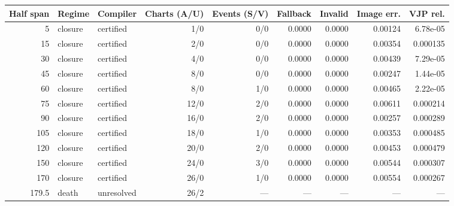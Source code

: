 \begin{tabular}{rllrrrrrr}
\toprule
Half span & Regime & Compiler & Charts (A/U) & Events (S/V) & Fallback & Invalid & Image err. & VJP rel. \\
\midrule
5 & closure & certified & 1/0 & 0/0 & 0.0000 & 0.0000 & 0.00124 & 6.78e-05 \\
15 & closure & certified & 2/0 & 0/0 & 0.0000 & 0.0000 & 0.00354 & 0.000135 \\
30 & closure & certified & 4/0 & 0/0 & 0.0000 & 0.0000 & 0.00439 & 7.29e-05 \\
45 & closure & certified & 8/0 & 0/0 & 0.0000 & 0.0000 & 0.00247 & 1.44e-05 \\
60 & closure & certified & 8/0 & 1/0 & 0.0000 & 0.0000 & 0.00465 & 2.22e-05 \\
75 & closure & certified & 12/0 & 2/0 & 0.0000 & 0.0000 & 0.00611 & 0.000214 \\
90 & closure & certified & 16/0 & 2/0 & 0.0000 & 0.0000 & 0.00257 & 0.000289 \\
105 & closure & certified & 18/0 & 1/0 & 0.0000 & 0.0000 & 0.00353 & 0.000485 \\
120 & closure & certified & 20/0 & 2/0 & 0.0000 & 0.0000 & 0.00453 & 0.000479 \\
150 & closure & certified & 24/0 & 3/0 & 0.0000 & 0.0000 & 0.00544 & 0.000307 \\
170 & closure & certified & 26/0 & 1/0 & 0.0000 & 0.0000 & 0.00554 & 0.000267 \\
179.5 & death & unresolved & 26/2 & — & — & — & — & — \\
\bottomrule
\end{tabular}
